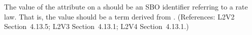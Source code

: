 The value of the  attribute on a \KineticLaw should be an SBO
identifier referring to a rate law.  That is, the value should be a term
derived from \sboratelaw.  (References: L2V2 Section~4.13.5; L2V3
Section~4.13.1; L2V4 Section~4.13.1.)
